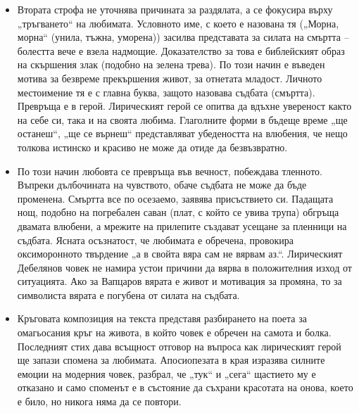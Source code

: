 \documentclass[12pt,a4paper]{article}
\begin{document}
\begin{itemize}[leftmargin=*]
\vspace{-0.2cm}
\item Втората строфа не уточнява причината за раздялата, а се фокусира върху „тръгването“ на любимата. Условното име, с което е назована тя („Морна, морна“ (унила, тъжна, уморена)) засилва представата за силата на смъртта – болестта вече е взела надмощие. Доказателство за това е библейският образ на скършения злак (подобно на зелена трева). По този начин е въведен мотива за безвреме прекършения живот, за отнетата младост. Личното местоимение \colorbox{yellow!40}{тя} е с главна буква, защото назовава съдбата (смъртта). Превръща е в герой. Лирическият герой се опитва да вдъхне увереност както на себе си, така и на своята любима. Глаголните форми в бъдеще време „ще останеш“, „ще се върнеш“ представляват убедеността на влюбения, че нещо толкова истинско и красиво не може да отиде да безвъзвратно.
\end{itemize}

\begin{itemize}[leftmargin=*]
\vspace{-0.2cm}
\item По този начин любовта се превръща във вечност, побеждава тленното. Въпреки дълбочината на чувството, обаче съдбата не може да бъде променена. Смъртта все по осезаемо, заявява присъствието си. Падащата нощ, подобно на погребален саван (плат, с който се увива трупа) обгръща двамата влюбени, а мрежите на прилепите създават усещане за пленници на съдбата. Ясната осъзнатост, че любимата е обречена, провокира оксиморонното твърдение „а в свойта вяра сам не вярвам аз.“. Лирическият Дебелянов човек не намира устои причини да вярва в положителния изход от ситуацията. Ако за Вапцаров вярата е живот и мотивация за промяна, то за символиста вярата е погубена от силата на съдбата.
\end{itemize}

\begin{itemize}[leftmargin=*]
\vspace{-0.2cm}
\item Кръговата композиция на текста представя разбирането на поета за омагьосания кръг на живота, в който човек е обречен на самота и болка. Последният стих дава всъщност отговор на въпроса как лирическият герой ще запази спомена за любимата. \colorbox{yellow!40}{Апосиопезата} в края изразява силните емоции на модерния човек, разбрал, че „тук“ и „сега“ щастието му е отказано и само споменът е в състояние да съхрани красотата на онова, което е било, но никога няма да се повтори. 
\end{itemize}
\newpage
\end{document}
